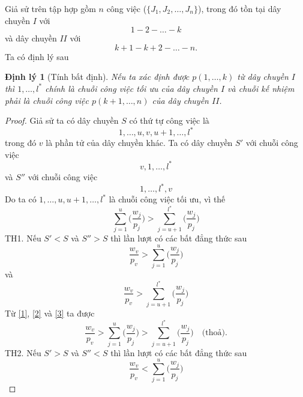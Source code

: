 \documentclass[12pt,a4paper]{report}
\newtheorem{dl}{Định lý}
\begin{document}
Giả sử trên tập hợp gồm $n$ công việc ($\{J_1, J_2, …, J_n\}$), trong đó tồn tại dây chuyền $I$ với
\begin{equation*}
1 - 2 - \ldots - k
\end{equation*}
và dây chuyền $II$ với
\begin{equation*}
k+1 - k+2 - \ldots - n.
\end{equation*}
Ta có định lý sau
\begin{dl}[Tính bất định]
	Nếu ta xác định được $p(1,\ldots,k)$ từ dây chuyền $I$ thì $1,\ldots,l^*$ chính là chuỗi công việc tối ưu của dây chuyền $I$ và chuỗi kế nhiệm phải là chuỗi công việc $p(k+1,\ldots,n)$ của dây chuyền $II$. 
\end{dl}

\begin{proof}
	Giả sử ta có dây chuyền $S$ có thứ tự công việc là 
	\begin{equation*}
	1,\ldots,u,v,u+1,\ldots,l^*
	\end{equation*}
	trong đó $v$ là phần tử của dây chuyền khác.
	Ta có dây chuyền $S'$ với chuỗi công việc
	\begin{equation*}
		v,1,\ldots,l^*
	\end{equation*}
	và $S''$ với chuỗi công việc
	\begin{equation*}
		1,\ldots,l^*,v
	\end{equation*}
	Do ta có $1,\ldots,u,u+1,\ldots,l^*$ là chuỗi công việc tối ưu, vì thế
	\begin{equation} \label{1}
		\sum_{j=1}^{u}\biggl(\frac{w_j}{p_j}\biggl) > \sum_{j=u+1}^{l^*}\biggl(\frac{w_j}{p_j}\biggl)
	\end{equation}
	TH1.
	Nếu $S' < S$ và $S''>S$ thì lần lượt có các bất đẳng thức sau
	\begin{equation} \label{2}
		\frac{w_v}{p_v} > \sum_{j=1}^{u}\biggl(\frac{w_j}{p_j}\biggr)
	\end{equation}
	và
	\begin{equation} \label{3}
		\frac{w_v}{p_v} > \sum_{j=u+1}^{l^*}\biggl(\frac{w_j}{p_j}\biggr)
	\end{equation}
	Từ \eqref{1}, \eqref{2} và \eqref{3} ta được
	\begin{equation}
		\frac{w_v}{p_v} > \sum_{j=1}^{u}\biggl(\frac{w_j}{p_j}\biggl) > \sum_{j=u+1}^{l^*}\biggl(\frac{w_j}{p_j}\biggl) \quad \text{(thoả).}
	\end{equation}
	TH2.
	Nếu $S' > S$ và $S'' < S$ thì lần lượt có các bất đẳng thức sau
	\begin{equation} \label{4}
		\frac{w_v}{p_v} < \sum_{j=1}^{u}\biggl(\frac{w_j}{p_j}\biggr)

\end{equation}
\end{proof}
\end{document}
